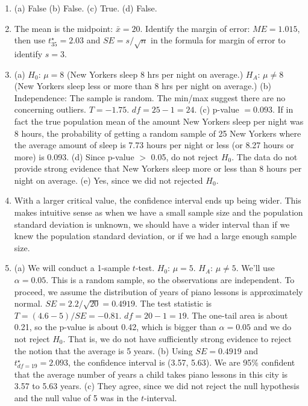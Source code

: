 \documentclass[
  10pt,
  openany]{book}
\begin{document}
\begin{enumerate}
  \addtocounter{enumi}{1}
\item
  (a) False (b) False. (c) True. (d) False.

  \addtocounter{enumi}{1}
\item
  The mean is the midpoint: \(\bar{x} = 20\). Identify the margin of error: \(ME = 1.015\), then use \(t^{\star}_{35} = 2.03\) and \(SE = s/ \sqrt{n}\) in the formula for margin of error to identify \(s = 3\).

  \addtocounter{enumi}{1}
\item
  (a) \(H_0\): \(\mu = 8\) (New Yorkers sleep 8 hrs per night on average.)
  \(H_A\): \(\mu \neq 8\) (New Yorkers sleep less or more than 8 hrs per night on average.) (b) Independence: The sample is random. The min/max suggest there are no concerning outliers. \(T = -1.75\). \(df=25-1=24\). (c) p-value \(= 0.093\). If in fact the true population mean of the amount New Yorkers sleep per night was 8 hours, the probability of getting a random sample of 25 New Yorkers where the average amount of sleep is 7.73 hours per night or less (or 8.27 hours or more) is 0.093. (d) Since p-value \(>\) 0.05, do not reject \(H_0\). The data do not provide strong evidence that New Yorkers sleep more or less than 8 hours per night on average. (e) Yes, since we did not rejected \(H_0\).

  \addtocounter{enumi}{1}
\item
  With a larger critical value, the confidence interval ends up being wider. This makes intuitive sense as when we have a small sample size and the population standard deviation is unknown, we should have a wider interval than if we knew the population standard deviation, or if we had a large enough sample size.

  \addtocounter{enumi}{1}
\item
  (a) We will conduct a 1-sample \(t\)-test. \(H_0\): \(\mu = 5\). \(H_A\): \(\mu \neq 5\). We'll use \(\alpha = 0.05\). This is a random sample, so the observations are independent. To proceed, we assume the distribution of years of piano lessons is approximately normal. \(SE = 2.2 / \sqrt{20} = 0.4919\). The test statistic is \(T = (4.6 - 5) / SE = -0.81\). \(df = 20 - 1 = 19\). The one-tail area is about 0.21, so the p-value is about 0.42, which is bigger than \(\alpha = 0.05\) and we do not reject \(H_0\). That is, we do not have sufficiently strong evidence to reject the notion that the average is 5 years. (b) Using \(SE = 0.4919\) and \(t_{df = 19}^{\star} = 2.093\), the confidence interval is (3.57, 5.63). We are 95\% confident that the average number of years a child takes piano lessons in this city is 3.57 to 5.63 years. (c) They agree, since we did not reject the null hypothesis and the null value of 5 was in the \(t\)-interval.

  \addtocounter{enumi}{1}
\end{enumerate}
\end{document}
